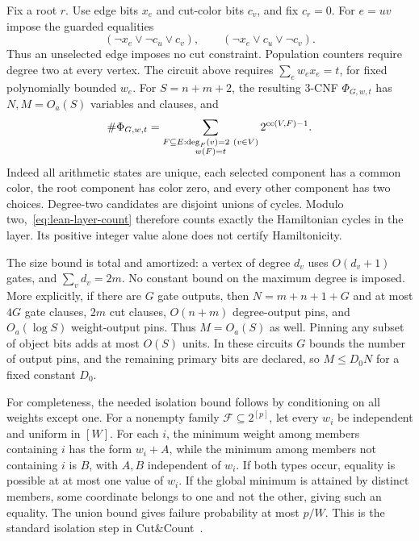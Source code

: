 Fix a root $r$. Use edge bits $x_e$ and cut-color bits $c_v$, and
fix $c_r=0$. For $e=uv$ impose the guarded equalities
\begin{equation}\label{eq:lean-cut-clauses}
 (\neg x_e\vee\neg c_u\vee c_v),\qquad
 (\neg x_e\vee c_u\vee\neg c_v).
\end{equation}
Thus an unselected edge imposes no cut constraint. Population
counters require degree two at every vertex. The circuit above
requires $\sum_e w_ex_e=t$, for fixed polynomially bounded $w_e$.
For $S=n+m+2$, the resulting 3-CNF $\Phi_{G,w,t}$ has
$N,M=O_a(S)$ variables and clauses, and
\begin{equation}\label{eq:lean-layer-count}
 \#\Phi_{G,w,t}
 =\sum_{\substack{F\subseteq E:\deg_F(v)=2\ (v\in V)\\w(F)=t}}
       2^{\operatorname{cc}(V,F)-1}.
\end{equation}
Indeed all arithmetic states are unique, each selected component
has a common color, the root component has color zero, and every
other component has two choices. Degree-two candidates are disjoint
unions of cycles. Modulo two,~\eqref{eq:lean-layer-count} therefore
counts exactly the Hamiltonian cycles in the layer. Its positive
integer value alone does not certify Hamiltonicity.

The size bound is total and amortized: a vertex of degree $d_v$
uses $O(d_v+1)$ gates, and $\sum_vd_v=2m$. No constant bound on
the maximum degree is imposed. More explicitly, if there are $G$
gate outputs, then $N=m+n+1+G$ and at most $4G$ gate clauses,
$2m$ cut clauses, $O(n+m)$ degree-output pins, and $O_a(\log S)$
weight-output pins. Thus $M=O_a(S)$ as well. Pinning any subset of
object bits adds at most $O(S)$ units. In these circuits $G$ bounds
the number of output pins, and the remaining primary bits are
declared, so $M\le D_0N$ for a fixed constant $D_0$.

For completeness, the needed isolation bound follows by conditioning
on all weights except one. For a nonempty family
$\mathcal F\subseteq2^{[p]}$, let every $w_i$ be independent and
uniform in $[W]$. For each $i$, the minimum weight among members
containing $i$ has the form $w_i+A$, while the minimum among members
not containing $i$ is $B$, with $A,B$ independent of $w_i$.
If both types occur, equality is possible at at most one value of
$w_i$. If the global minimum is attained by distinct members, some
coordinate belongs to one and not the other, giving such an equality.
The union bound gives failure probability at most $p/W$.
This is the standard isolation step in Cut\&Count~\cite{CutCount11}.

